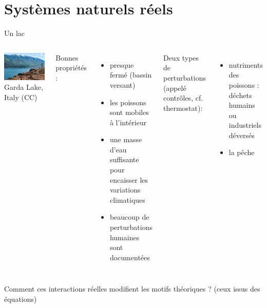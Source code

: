 \documentclass[11,aspectratio=1610]{beamer}
\begin{document}
\section{Systèmes naturels réels}



\begin{frame}{Un lac}
\begin{footnotesize}
 \begin{columns}
\includegraphics[width=\textwidth]{img/lake_garda_italy.jpg}
\tiny{Garda Lake, Italy (CC)}
          
Bonnes propriétés : 
\begin{itemize}
  \item  presque fermé (bassin versant)
  \item  les poissons sont mobiles à l'intérieur
  \item  une masse d'eau suffisante pour encaisser les variations climatiques 
  \item  beaucoup de perturbations humaines sont documentées 
\end{itemize}

Deux types de perturbations (appelé \alert{contrôles}, cf. thermostat): 

\begin{itemize}
\item nutriments des poissons :  déchets humains ou industriels déversés 
\item la pêche   
\end{itemize}
\end{columns}
\end{footnotesize}
\vfill
Comment ces interactions réelles modifient les motifs théoriques ?  (ceux issus des équations)  
 
\end{frame}
\end{document}
